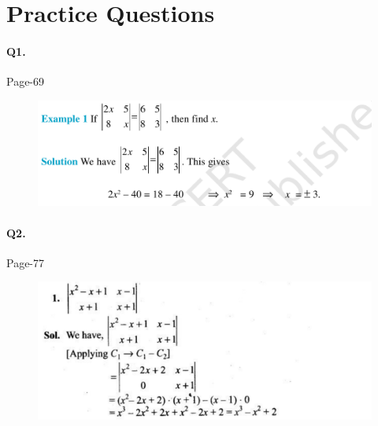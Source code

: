 \documentclass{article}
\begin{document}
\section*{Practice Questions}
\paragraph{Q1.}
\begin{flushright}
Page-69
\end{flushright}
\begin{figure}[H]
    \includegraphics[scale=0.5]{determinants_l1_ps_1.png}
\end{figure}
\clearpage
\paragraph{Q2.}
\begin{flushright}
Page-77
\end{flushright}
\begin{figure}[H]
    \includegraphics[scale=0.5]{determinants_l1_ps_2.png}
\end{figure}
\clearpage
\end{document}
